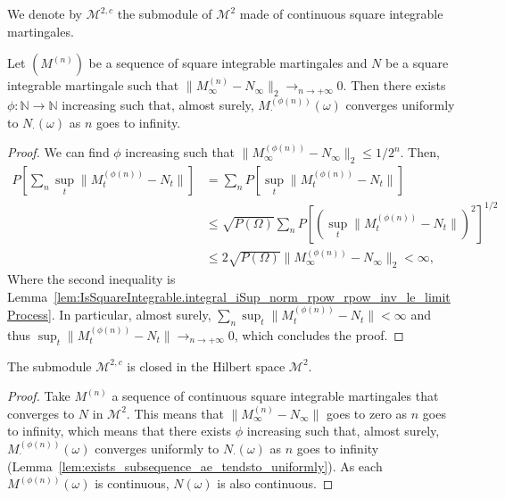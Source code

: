 \begin{definition}\label{def:continuousSquareIntegrable}
  \leanok
We denote by $\mathcal{M}^{2,c}$ the submodule of $\mathcal{M}^2$ made of continuous square integrable martingales.
\end{definition}


\begin{lemma}\label{lem:exists_subsequence_ae_tendsto_uniformly}
  \leanok
Let $(M^{(n)})$ be a sequence of square integrable martingales and $N$ be a square integrable martingale such that $\|M^{(n)}_\infty - N_\infty\|_2 \longrightarrow_{n \to +\infty} 0$. Then there exists $\phi : \mathbb{N} \to \mathbb{N}$ increasing such that, almost surely, $M^{(\phi(n))}_\cdot(\omega)$ converges uniformly to $N_\cdot(\omega)$ as $n$ goes to infinity.
\end{lemma}

\begin{proof}
  \leanok
We can find $\phi$ increasing such that $\|M^{(\phi(n))}_\infty - N_\infty\|_2 \le 1/2^n$. Then,
\begin{align*}
  P[\sum_n \sup_t \|M^{(\phi(n))}_t -  N_t\|] & = \sum_n P[\sup_t \|M^{(\phi(n))}_t -  N_t\|] \\
  & \le \sqrt{P(\Omega)} \sum_n P[(\sup_t \|M^{(\phi(n))}_t -  N_t\|)^2]^{1/2} \\
  & \le 2 \sqrt{P(\Omega)} \|M^{(\phi(n))}_\infty - N_\infty\|_2 < \infty,
\end{align*}
Where the second inequality is Lemma~\ref{lem:IsSquareIntegrable.integral_iSup_norm_rpow_rpow_inv_le_limitProcess}. In particular, almost surely, $\sum_n \sup_t \|M^{(\phi(n))}_t -  N_t\| < \infty$ and thus $\sup_t \|M^{(\phi(n))}_t -  N_t\| \longrightarrow_{n \to +\infty} 0$, which concludes the proof.
\end{proof}


\begin{lemma}\label{lem:isClosed_continuousSquareIntegrable}
  \leanok
The submodule $\mathcal{M}^{2,c}$ is closed in the Hilbert space $\mathcal{M}^2$.
\end{lemma}

\begin{proof}
  \leanok
Take $M^{(n)}$ a sequence of continuous square integrable martingales that converges to $N$ in $\mathcal{M}^2$. This means that $\|M^{(n)}_\infty - N_\infty\|$ goes to zero as $n$ goes to infinity, which means that there exists $\phi$ increasing such that, almost surely, $M^{(\phi(n))}_\cdot(\omega)$ converges uniformly to $N_\cdot(\omega)$ as $n$ goes to infinity (Lemma~\ref{lem:exists_subsequence_ae_tendsto_uniformly}). As each $M^{(\phi(n))}(\omega)$ is continuous, $N(\omega)$ is also continuous.
\end{proof}


